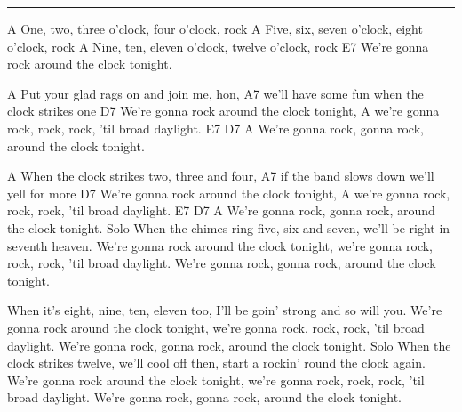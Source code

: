 \noindent\rule{\columnwidth}{1pt}

\begin{lstsong}
A
One, two, three o'clock, four o'clock, rock
A
Five, six, seven o'clock, eight o'clock, rock
A
Nine, ten, eleven o'clock, twelve o'clock, rock
            E7
We're gonna rock around the clock tonight.

         A
Put your glad rags on and join me, hon,
                             A7
we'll have some fun when the clock strikes one
            D7
We're gonna rock around the clock tonight,
                  A
we're gonna rock, rock, rock, 'til broad daylight.
            E7                 D7                A
We're gonna rock, gonna rock, around the clock tonight.

         A
When the clock strikes two, three and four,
                             A7
if the band slows down we'll yell for more
            D7
We're gonna rock around the clock tonight,
                  A
we're gonna rock, rock, rock, 'til broad daylight.
            E7                 D7                A
We're gonna rock, gonna rock, around the clock tonight.
Solo
When the chimes ring five, six and seven,
we'll be right in seventh heaven.
We're gonna rock around the clock tonight,
we're gonna rock, rock, rock, 'til broad daylight.
We're gonna rock, gonna rock, around the clock tonight.

When it's eight, nine, ten, eleven too,
I'll be goin' strong and so will you.
We're gonna rock around the clock tonight,
we're gonna rock, rock, rock, 'til broad daylight.
We're gonna rock, gonna rock, around the clock tonight.
Solo
When the clock strikes twelve, we'll cool off then,
start a rockin' round the clock again.
We're gonna rock around the clock tonight,
we're gonna rock, rock, rock, 'til broad daylight.
We're gonna rock, gonna rock, around the clock tonight.
\end{lstsong}
\newpage

